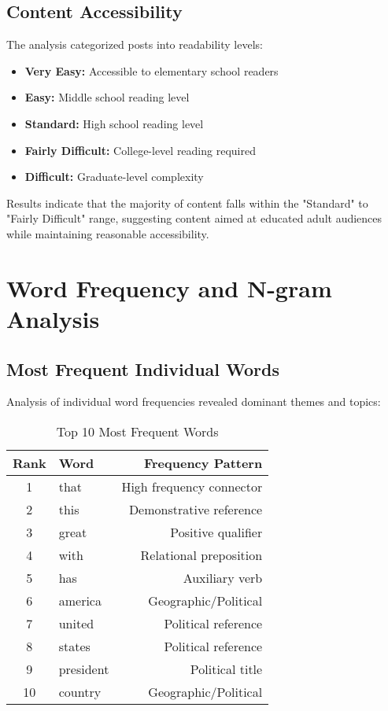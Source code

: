 \documentclass[12pt,a4paper]{article}
\begin{document}
\subsection{Content Accessibility}

The analysis categorized posts into readability levels:
\begin{itemize}
    \item \textbf{Very Easy:} Accessible to elementary school readers
    \item \textbf{Easy:} Middle school reading level
    \item \textbf{Standard:} High school reading level  
    \item \textbf{Fairly Difficult:} College-level reading required
    \item \textbf{Difficult:} Graduate-level complexity
\end{itemize}

Results indicate that the majority of content falls within the "Standard" to "Fairly Difficult" range, suggesting content aimed at educated adult audiences while maintaining reasonable accessibility.

\section{Word Frequency and N-gram Analysis}

\subsection{Most Frequent Individual Words}

Analysis of individual word frequencies revealed dominant themes and topics:

\begin{table}[h!]
\centering
\caption{Top 10 Most Frequent Words}
\begin{tabular}{@{}clr@{}}
\toprule
\textbf{Rank} & \textbf{Word} & \textbf{Frequency Pattern} \\
\midrule
1 & that & High frequency connector \\
2 & this & Demonstrative reference \\
3 & great & Positive qualifier \\
4 & with & Relational preposition \\
5 & has & Auxiliary verb \\
6 & america & Geographic/Political \\
7 & united & Political reference \\
8 & states & Political reference \\
9 & president & Political title \\
10 & country & Geographic/Political \\
\bottomrule
\end{tabular}
\end{table}
\end{document}
